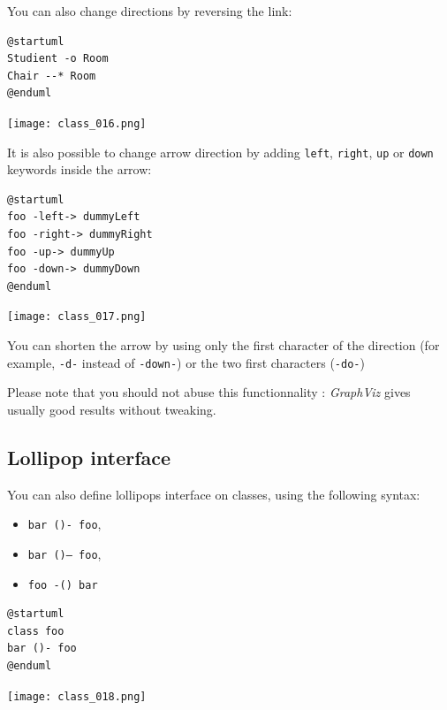 You can also change directions by reversing the link:
\begin{lstlisting}
@startuml
Studient -o Room
Chair --* Room
@enduml
\end{lstlisting}
\begin{center}
\texttt{[image: class\_016.png]}
\end{center}

It is also possible to change arrow direction by adding \texttt{left},
\texttt{right}, \texttt{up} or \texttt{down} keywords inside the arrow:

\begin{lstlisting}
@startuml
foo -left-> dummyLeft 
foo -right-> dummyRight 
foo -up-> dummyUp 
foo -down-> dummyDown
@enduml
\end{lstlisting}
\begin{center}
\texttt{[image: class\_017.png]}
\end{center}

You can shorten the arrow by using only the first character of the direction
(for example, \texttt{-d-} instead of \texttt{-down-}) or the two first
characters (\texttt{-do-})

Please note that you should not abuse this functionnality : \textit{GraphViz}
gives usually good results without tweaking.

\subsection{Lollipop interface}

You can also define lollipops interface on classes, using the following syntax:

\begin{itemize}
    \item  \texttt{bar ()- foo},
    \item  \texttt{bar ()-- foo},
    \item  \texttt{foo -() bar}
\end{itemize}

\begin{lstlisting}
@startuml
class foo
bar ()- foo
@enduml
\end{lstlisting}


\begin{center}
\texttt{[image: class\_018.png]}
\end{center}

